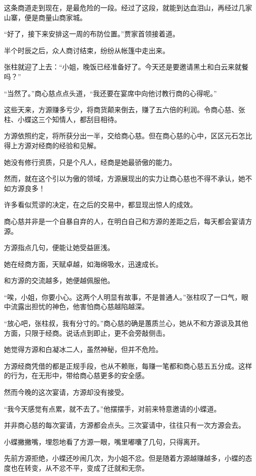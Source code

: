 \begin{this_body}
这条商道走到现在，是最危险的一段。经过了这段，就能到达血泪山，再经过几家山寨，便是商量山商家城。

“好了，接下来安排这一周的布防位置。”贾家首领接着道。

半个时辰之后，众人商讨结束，纷纷从帐篷中走出来。

张柱就迎了上去：“小姐，晚饭已经准备好了。今天还是要邀请黑土和白云来就餐吗？”

“当然了。”商心慈点点头道，“我还要在宴席中向他讨教行商的心得呢。”

这些天来，方源赚多亏少，将商货颠来倒去，赚了五六倍的利润。令商心慈、张柱、小蝶这三个知情人，都刮目相待。

方源依照约定，将所获分出一半，交给商心慈。但在商心慈的心中，区区元石怎比得上方源对经商的经验和见解。

她没有修行资质，只是个凡人，经商是她最骄傲的能力。

然而，就在这个引以为傲的领域，方源展现出的实力让商心慈也不得不承认，她不如方源良多！

许多看似荒谬的决定，在之后的交易中，都显现出惊人的成效。

商心慈并非是一个自暴自弃的人，在明白自己和方源的差距之后，每天都会宴请方源。

方源指点几句，便能让她受益匪浅。

她在经商方面，天赋卓越，如海绵吸水，迅速成长。

和方源的交流越多，她便越佩服他。

“唉，小姐，你要小心。这两个人明显有故事，不是普通人。”张柱叹了一口气，眼中流露出担忧的神色，他害怕商心慈越陷越深。

“放心吧，张柱叔，我有分寸的。”商心慈的确是蕙质兰心，她从不和方源谈及其他方面，只限于经商。说话点到即止，更不会旁敲侧击。

她觉得方源和白凝冰二人，虽然神秘，但并不危险。

方源经商凭借的都是正规手段，也从不赖账，每赚一笔都和商心慈五五分成。这样的行为，在无形中，带给商心慈更多的安全感。

然而今晚的这次宴请，方源却没有接受。

“我今天感觉有点累，就不去了。”他摆摆手，对前来特意邀请的小蝶道。

并非商心慈的每次宴请，方源都会点头。三次宴请中，往往只有一次方源会去。

小蝶撇撇嘴，埋怨地看了方源一眼，嘴里嘟囔了几句，只得离开。

先前方源拒绝，小蝶还吵闹几次，为小姐不忿。但是随着方源越赚越多，小蝶的态度也在转变，从不忿不平，变成了迁就和无奈。


\end{this_body}
